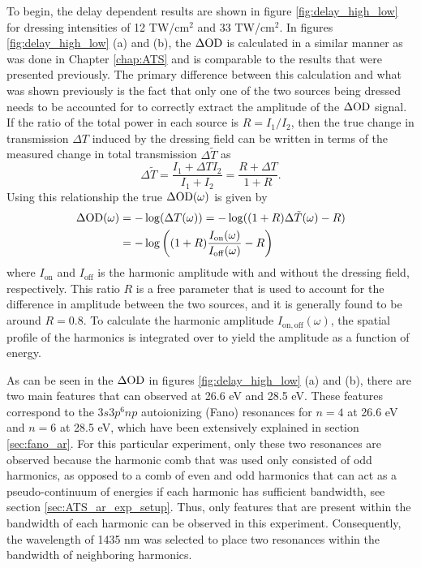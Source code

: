 To begin, the delay dependent results are shown in figure \ref{fig:delay_high_low} for dressing intensities of 12 TW/cm$^2$ and 33 TW/cm$^2$. In figures \ref{fig:delay_high_low} (a) and (b), the $\Delta\mathrm{OD}$ is calculated in a similar manner as was done in Chapter \ref{chap:ATS}  and is comparable to the results that were presented previously. The primary difference between this calculation and what was shown previously is the fact that only one of the two sources being dressed needs to be accounted for to correctly extract the amplitude of the $\Delta\mathrm{OD}$ signal.  If the ratio of the total power in each source is $R=I_1/I_2$, then the true change in transmission $\Delta T$ induced by the dressing field can be written in terms of the measured change in total transmission $\Delta \tilde{T}$ as
\begin{equation}
	\label{eqn:dod_fringe_shift}
	\Delta \tilde{T} = \frac{I_1 + \Delta T I_2}{I_1 + I_2} = \frac{R + \Delta T}{1+ R}.
\end{equation}
Using this relationship the true $\Delta\mathrm{OD}(\omega)$ is given by 
\begin{equation}
	\label{eqn:dod_R}
	\begin{aligned}
		\Delta\mathrm{OD}(\omega) & = -\log(\Delta T(\omega)) = -\log((1+R)\Delta \tilde{T}(\omega) - R) \\
		&= -\log\bigg((1+R)\frac{I_{\mathrm{on}}(\omega)}{I_{\mathrm{off}}(\omega)} - R\bigg)
	\end{aligned}
\end{equation}
where $I_{\mathrm{on}}$ and $I_{\mathrm{off}}$ is the harmonic amplitude with and without the dressing field, respectively.  This ratio $R$ is a free parameter that is used to account for the difference in amplitude between the two sources, and it is generally found to be around $R=0.8$.  To calculate the harmonic amplitude $I_{\mathrm{on,off}}(\omega)$, the spatial profile of the harmonics is integrated over to yield the amplitude as a function of energy.

As can be seen in the $\Delta\mathrm{OD}$ in figures \ref{fig:delay_high_low} (a) and (b), there are two main features that can observed at 26.6 eV and 28.5 eV.  These features correspond to the $3s3p^6np$ autoionizing (Fano) resonances for $n=4$ at 26.6 eV and $n=6$ at 28.5 eV, which have been extensively explained in section \ref{sec:fano_ar}.  For this particular experiment, only these two resonances are observed because the harmonic comb that was used only consisted of odd harmonics, as opposed to a comb of even and odd harmonics that can act as a pseudo-continuum of energies if each harmonic has sufficient bandwidth, see section \ref{sec:ATS_ar_exp_setup}.  Thus, only features that are present within the bandwidth of each harmonic can be observed in this experiment.  Consequently, the wavelength of 1435 nm was selected to place two resonances within the bandwidth of neighboring harmonics.

